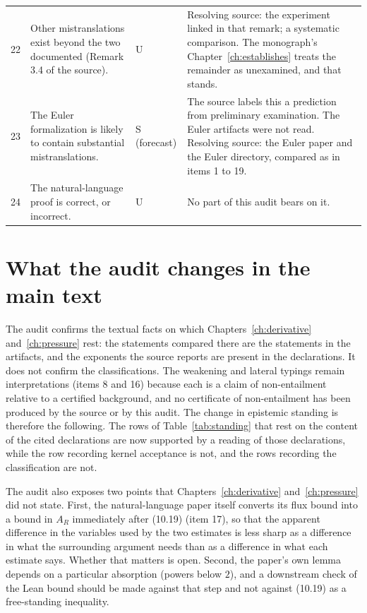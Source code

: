 \begin{longtable}{@{}p{}p{}p{}p{}@{}}
22 & Other mistranslations exist beyond the two documented (Remark 3.4 of the source). & U & Resolving source: the experiment linked in that remark; a systematic comparison. The monograph's Chapter~\ref{ch:establishes} treats the remainder as unexamined, and that stands. \\
23 & The Euler formalization is likely to contain substantial mistranslations. & S (forecast) & The source labels this a prediction from preliminary examination. The Euler artifacts were not read. Resolving source: the Euler paper and the Euler directory, compared as in items 1 to 19. \\
24 & The natural-language proof is correct, or incorrect. & U & No part of this audit bears on it. \\
\end{longtable}

\section{What the audit changes in the main text}

The audit confirms the textual facts on which Chapters~\ref{ch:derivative} and~\ref{ch:pressure} rest: the statements compared there are the statements in the artifacts, and the exponents the source reports are present in the declarations. It does not confirm the classifications. The weakening and lateral typings remain interpretations (items 8 and 16) because each is a claim of non-entailment relative to a certified background, and no certificate of non-entailment has been produced by the source or by this audit. The change in epistemic standing is therefore the following. The rows of Table~\ref{tab:standing} that rest on the content of the cited declarations are now supported by a reading of those declarations, while the row recording kernel acceptance is not, and the rows recording the classification are not.

The audit also exposes two points that Chapters~\ref{ch:derivative} and~\ref{ch:pressure} did not state. First, the natural-language paper itself converts its flux bound into a bound in $A_R$ immediately after (10.19) (item 17), so that the apparent difference in the variables used by the two estimates is less sharp as a difference in what the surrounding argument needs than as a difference in what each estimate says. Whether that matters is open. Second, the paper's own lemma depends on a particular absorption (powers below $2$), and a downstream check of the Lean bound should be made against that step and not against (10.19) as a free-standing inequality.

